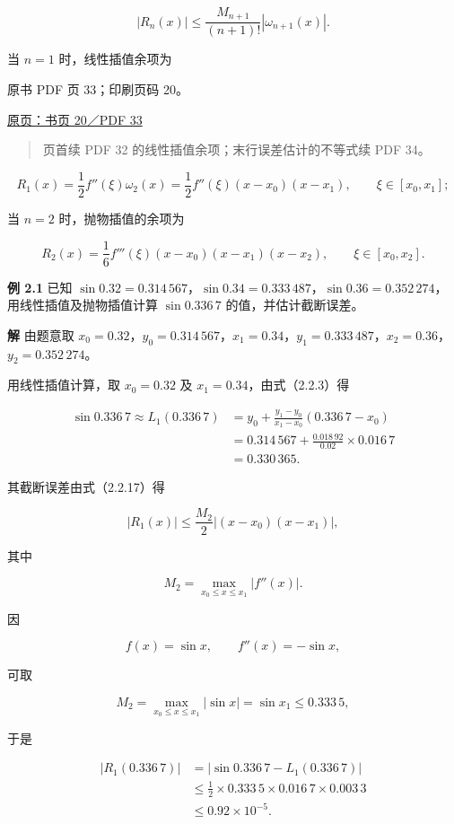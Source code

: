 \[
|R_n(x)|\le\frac{M_{n+1}}{(n+1)!}|\omega_{n+1}(x)|.
\tag{2.2.16}
\]

当 \(n=1\) 时，线性插值余项为

\clearpage

原书 PDF 页 33；印刷页码 20。

\href{source-images/pdf-033.jpeg}{原页：书页 20／PDF 33}

\begin{quote}
页首续 PDF 32 的线性插值余项；末行误差估计的不等式续 PDF 34。
\end{quote}

\[
R_1(x)=\frac12 f''(\xi)\omega_2(x)
=\frac12 f''(\xi)(x-x_0)(x-x_1),
\qquad \xi\in[x_0,x_1];
\tag{2.2.17}
\]

当 \(n=2\) 时，抛物插值的余项为

\[
R_2(x)=\frac16 f'''(\xi)(x-x_0)(x-x_1)(x-x_2),
\qquad \xi\in[x_0,x_2].
\tag{2.2.18}
\]

\textbf{例 2.1} 已知 \(\sin0.32=0.314\,567\)，\(\sin0.34=0.333\,487\)，\(\sin0.36=0.352\,274\)，用线性插值及抛物插值计算 \(\sin0.336\,7\) 的值，并估计截断误差。

\textbf{解} 由题意取 \(x_0=0.32\)，\(y_0=0.314\,567\)，\(x_1=0.34\)，\(y_1=0.333\,487\)，\(x_2=0.36\)，\(y_2=0.352\,274\)。

用线性插值计算，取 \(x_0=0.32\) 及 \(x_1=0.34\)，由式（2.2.3）得

\[
\begin{aligned}
\sin0.336\,7\approx L_1(0.336\,7)
&=y_0+\frac{y_1-y_0}{x_1-x_0}(0.336\,7-x_0)\\
&=0.314\,567+\frac{0.018\,92}{0.02}\times0.016\,7\\
&=0.330\,365.
\end{aligned}
\]

其截断误差由式（2.2.17）得

\[
|R_1(x)|\le\frac{M_2}{2}|(x-x_0)(x-x_1)|,
\]

其中

\[
M_2=\max_{x_0\le x\le x_1}|f''(x)|.
\]

因

\[
f(x)=\sin x,\qquad f''(x)=-\sin x,
\]

可取

\[
M_2=\max_{x_0\le x\le x_1}|\sin x|=\sin x_1\le0.333\,5,
\]

于是

\[
\begin{aligned}
|R_1(0.336\,7)|
&=|\sin0.336\,7-L_1(0.336\,7)|\\
&\le\frac12\times0.333\,5\times0.016\,7\times0.003\,3\\
&\le0.92\times10^{-5}.
\end{aligned}
\]

